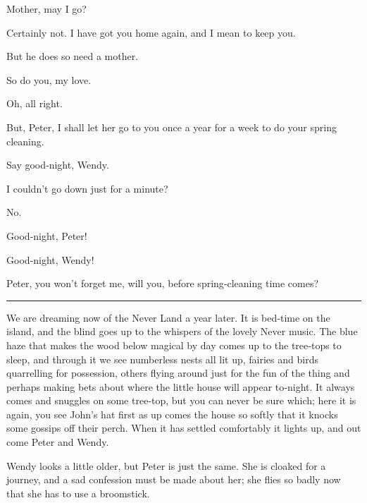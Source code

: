 \begin{drama}
Mother, may I go?

Certainly not.
I have got you home again, and I mean to keep you.

\wendyspeaks
But he does so need a mother.

\mrsdarlingspeaks
So do you, my love.

\peterspeaks
Oh, all right.

But, Peter, I shall let her go to you once a year for a week to do your spring cleaning.


\mrsdarlingspeaks
Say good‐night, Wendy.

\wendyspeaks
I couldn’t go down just for a minute?

\mrsdarlingspeaks
No.

\wendyspeaks
Good‐night, Peter!

\peterspeaks
Good‐night, Wendy!

\wendyspeaks
Peter, you won’t forget me, will you, before spring‐cleaning time comes?


\plainbreak{1}

\begin{Settings}
We are dreaming now of the Never Land a year later.
It is bed‐time on the island, and the blind goes up to the whispers of the lovely Never music.
The blue haze that makes the wood below magical by day comes up to the tree‐tops to sleep,
and through it we see numberless nests all lit up, fairies and birds quarrelling for possession,
others flying around just for the fun of the thing
and perhaps making bets about where the little house will appear to‐night.
It always comes and snuggles on some tree‐top, but you can never be sure which;
here it is again, you see John’s hat first as up comes the house
so softly that it knocks some gossips off their perch.
When it has settled comfortably it lights up, and out come Peter and Wendy.

Wendy looks a little older, but Peter is just the same.
She is cloaked for a journey, and a sad confession must be made about her;
she flies so badly now that she has to use a broomstick.
\end{Settings}


\end{drama}
